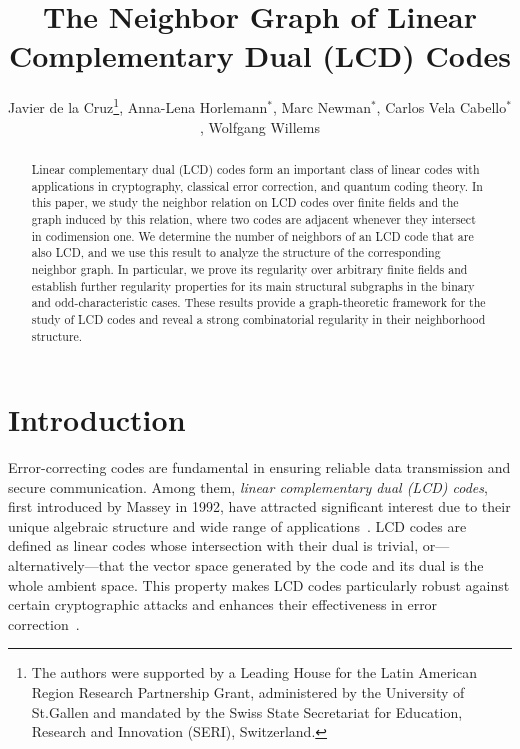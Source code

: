 \documentclass[11pt]{article}
\title{The Neighbor Graph of Linear Complementary Dual (LCD) Codes}
\author{Javier de la Cruz\footnote{The authors were supported by a Leading House for the Latin American Region Research Partnership Grant, administered by the University of St.Gallen and mandated by the Swiss State Secretariat for Education, Research and Innovation (SERI), Switzerland.}, Anna-Lena Horlemann$^*$, Marc Newman$^*$, Carlos Vela Cabello$^*$, Wolfgang Willems}
\theoremstyle{definition}
\begin{document}
\maketitle


\begin{abstract}
	Linear complementary dual (LCD) codes form an important class of linear codes with applications in cryptography, classical error correction, and quantum coding theory.
	In this paper, we study the neighbor relation on LCD codes over finite fields and the graph induced by this relation, where two codes are adjacent whenever they intersect in codimension one.
We determine the number of neighbors of an LCD code that are also LCD, and we use this result to analyze the structure of the corresponding neighbor graph.
	In particular, we prove its regularity over arbitrary finite fields and establish further regularity properties for its main structural subgraphs in the binary and odd-characteristic cases.
These results provide a graph-theoretic framework for the study of LCD codes and reveal a strong combinatorial regularity in their neighborhood structure.
\end{abstract}


\section{Introduction}

Error-correcting codes are fundamental in ensuring reliable data transmission and secure communication.
Among them, \emph{linear complementary dual (LCD) codes}, first introduced by Massey in 1992, have attracted significant interest due to their unique algebraic structure and wide range of applications~\cite{Mas92}.
LCD codes are defined as linear codes whose intersection with their dual is trivial, or---alternatively---that the vector space generated by the code and its dual is the whole ambient space.
This property makes LCD codes particularly robust against certain cryptographic attacks and enhances their effectiveness in error correction~\cite{CG14}.
\end{document}

